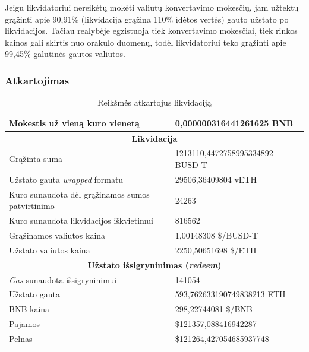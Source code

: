 \documentclass[]{VUMIFTemplateClass}
\begin{document}
\noindent
Jeigu likvidatoriui nereikėtų mokėti valiutų konvertavimo mokesčių, 
jam užtektų grąžinti apie 90,91\% (likvidacija grąžina 110\% įdėtos vertės) 
gauto užstato po likvidacijos. Tačiau realybėje egzistuoja tiek 
konvertavimo mokesčiai, tiek rinkos kainos gali skirtis nuo orakulo 
duomenų, todėl likvidatoriui teko grąžinti apie 99,45\% galutinės 
gautos valiutos.

\subsubsection{Atkartojimas}

\begin{table}[h!]
  \centering
  \caption{Reikšmės atkartojus likvidaciją}
  \begin{tabular}{|l|l|}
    \hline
    Mokestis už vieną kuro vienetą                           & 0,000000316441261625 BNB        \\
  \hline
  \multicolumn{2}{|c|}{\textbf{Likvidacija}}                              \\ \hline
  Grąžinta suma                            & 1213110,4472758995334892 BUSD-T         \\ \hline
  Užstato gauta \textit{wrapped} formatu             & 29506,36409804 vETH                     \\ \hline
  Kuro sunaudota dėl grąžinamos sumos patvirtinimo            & 24263                              \\ \hline
  Kuro sunaudota likvidacijos iškvietimui              & 816562                             \\ \hline
  Grąžinamos valiutos kaina               & 1,00148308 \$/BUSD-T               \\ \hline
  Užstato valiutos kaina          & 2250,50651698 \$/ETH            \\ \hline
  \multicolumn{2}{|c|}{\textbf{Užstato išsigryninimas (\textit{redeem})}}                                         \\ \hline
  \textit{Gas} sunaudota išsigryninimui                   & 141054                             \\ \hline
  Užstato gauta           & 593,762633190749838213 ETH             \\ \hline
  BNB kaina                & 298,22744081 \$/BNB             \\ \hline
  Pajamos                & \$121357,088416942287              \\ \hline
  Pelnas                 & \$121264,427054685937748              \\ \hline
  \end{tabular}
  \label{liquidation_example_repeat}
  \end{table}
\end{document}

